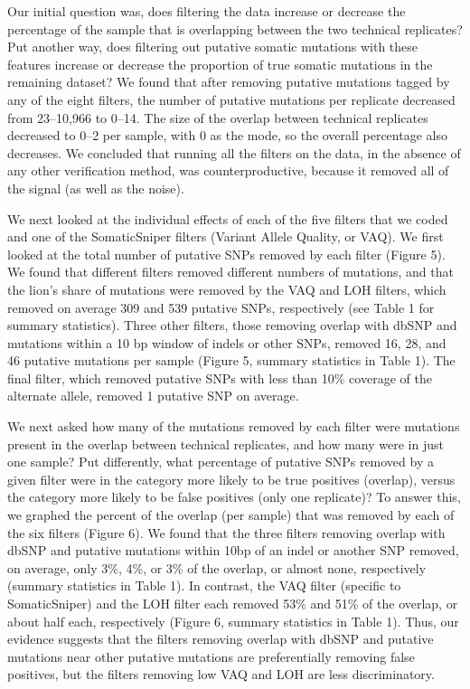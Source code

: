\documentclass[11pt]{article} %
\begin{document}
Our initial question was, does filtering the data increase or decrease the percentage of the sample that is overlapping between the two technical replicates? Put another way, does filtering out putative somatic mutations with these features increase or decrease the proportion of true somatic mutations in the remaining dataset? We found that after removing putative mutations tagged by any of the eight filters, the number of putative mutations per replicate decreased from 23--10,966 to 0--14. The size of the overlap between technical replicates decreased to 0--2 per sample, with 0 as the mode, so the overall percentage also decreases. We concluded that running all the filters on the data, in the absence of any other verification method, was counterproductive, because it removed all of the signal (as well as the noise). 

We next looked at the individual effects of each of the five filters that we coded and one of the SomaticSniper filters (Variant Allele Quality, or VAQ). We first looked at the total number of putative SNPs removed by each filter (Figure 5). We found that different filters removed different numbers of mutations, and that the lion's share of mutations were removed by the VAQ and LOH filters, which removed on average 309 and 539 putative SNPs, respectively (see Table 1 for summary statistics). Three other filters, those removing overlap with dbSNP and mutations within a 10 bp window of indels or other SNPs, removed 16, 28, and 46 putative mutations per sample (Figure 5, summary statistics in Table 1). The final filter, which removed putative SNPs with less than 10\% coverage of the alternate allele, removed 1 putative SNP on average. 

We next asked how many of the mutations removed by each filter were mutations present in the overlap between technical replicates, and how many were in just one sample? Put differently, what percentage of putative SNPs removed by a given filter were in the category more likely to be true positives (overlap), versus the category more likely to be false positives (only one replicate)? To answer this, we graphed the percent of the overlap (per sample) that was removed by each of the six filters (Figure 6). We found that the three filters removing overlap with dbSNP and putative mutations within 10bp of an indel or another SNP removed, on average, only 3\%, 4\%, or 3\% of the overlap, or almost none, respectively (summary statistics in Table 1). In contrast, the VAQ filter (specific to SomaticSniper) and the LOH filter each removed 53\% and 51\% of the overlap, or about half each, respectively (Figure 6, summary statistics in Table 1). Thus, our evidence suggests that the filters removing overlap with dbSNP and putative mutations near other putative mutations are preferentially removing false positives, but the filters removing low VAQ and LOH are less discriminatory. 
\end{document}
